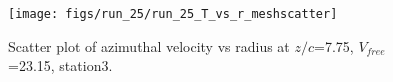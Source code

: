 \begin{figure}[H]
\centering
\texttt{[image: figs/run\_25/run\_25\_T\_vs\_r\_meshscatter]}
\caption{Scatter plot of azimuthal velocity vs radius at $z/c$=7.75, $V_{free}$=23.15, station3.}
\label{fig:run_25_T_vs_r_meshscatter}
\end{figure}


